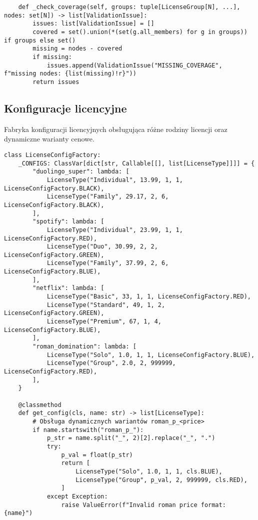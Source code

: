 {\begin{verbatim}
    def _check_coverage(self, groups: tuple[LicenseGroup[N], ...], nodes: set[N]) -> list[ValidationIssue]:
        issues: list[ValidationIssue] = []
        covered = set().union(*(set(g.all_members) for g in groups)) if groups else set()
        missing = nodes - covered
        if missing:
            issues.append(ValidationIssue("MISSING_COVERAGE", f"missing nodes: {list(missing)!r}"))
        return issues
\end{verbatim}
}

\subsection{Konfiguracje licencyjne}
Fabryka konfiguracji licencyjnych obsługująca różne rodziny
licencji oraz dynamiczne warianty cenowe.

    {\footnotesize
        \begin{verbatim}
class LicenseConfigFactory:
    _CONFIGS: ClassVar[dict[str, Callable[[], list[LicenseType]]]] = {
        "duolingo_super": lambda: [
            LicenseType("Individual", 13.99, 1, 1, LicenseConfigFactory.BLACK),
            LicenseType("Family", 29.17, 2, 6, LicenseConfigFactory.BLACK),
        ],
        "spotify": lambda: [
            LicenseType("Individual", 23.99, 1, 1, LicenseConfigFactory.RED),
            LicenseType("Duo", 30.99, 2, 2, LicenseConfigFactory.GREEN),
            LicenseType("Family", 37.99, 2, 6, LicenseConfigFactory.BLUE),
        ],
        "netflix": lambda: [
            LicenseType("Basic", 33, 1, 1, LicenseConfigFactory.RED),
            LicenseType("Standard", 49, 1, 2, LicenseConfigFactory.GREEN),
            LicenseType("Premium", 67, 1, 4, LicenseConfigFactory.BLUE),
        ],
        "roman_domination": lambda: [
            LicenseType("Solo", 1.0, 1, 1, LicenseConfigFactory.BLUE),
            LicenseType("Group", 2.0, 2, 999999, LicenseConfigFactory.RED),
        ],
    }

    @classmethod
    def get_config(cls, name: str) -> list[LicenseType]:
        # Obsługa dynamicznych wariantów roman_p_<price>
        if name.startswith("roman_p_"):
            p_str = name.split("_", 2)[2].replace("_", ".")
            try:
                p_val = float(p_str)
                return [
                    LicenseType("Solo", 1.0, 1, 1, cls.BLUE),
                    LicenseType("Group", p_val, 2, 999999, cls.RED),
                ]
            except Exception:
                raise ValueError(f"Invalid roman price format: {name}")


\end{verbatim}}
